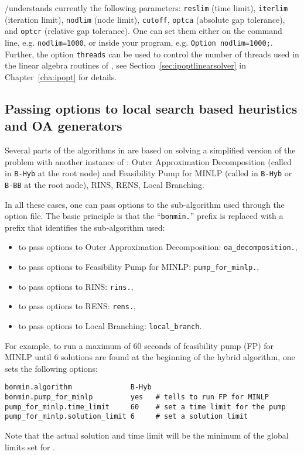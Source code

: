 \GAMS/\BONMIN understands currently the following \GAMS parameters: \texttt{reslim} (time limit), \texttt{iterlim} (iteration limit), \texttt{nodlim} (node limit), \texttt{cutoff}, \texttt{optca} (absolute gap tolerance), and \texttt{optcr} (relative gap tolerance).
One can set them either on the command line, e.g. \verb+nodlim=1000+, or inside your \GAMS program, e.g. \verb+Option nodlim=1000;+.
Further, the option \texttt{threads} can be used to control the number of threads used in the linear algebra routines of \IPOPT, see Section~\ref{sec:ipoptlinearsolver} in Chapter~\ref{cha:ipopt} for details.

\subsection{Passing options to local search based heuristics and OA generators}
Several parts of the algorithms in \BONMIN are based on solving a simplified version of the problem with another instance of \BONMIN:
Outer Approximation Decomposition (called in {\tt B-Hyb} at the root node)
and Feasibility Pump for MINLP (called in {\tt B-Hyb} or {\tt B-BB} at the root node), RINS, RENS, Local Branching.

In all these cases, one can pass options to the sub-algorithm used through the option file.
The basic principle is that the ``\texttt{bonmin.}'' prefix  is replaced with a prefix that identifies the sub-algorithm used:
\begin{itemize}
\vspace{-2ex}
\setlength{\parskip}{.2ex}
\setlength{\itemsep}{0pt}
\setlength{\partopsep}{0pt}
\item to pass options to Outer Approximation Decomposition: {\tt oa\_decomposition.},
\item to pass options to Feasibility Pump for MINLP: {\tt pump\_for\_minlp.},
\item to pass options to RINS: {\tt rins.},
\item to pass options to RENS: {\tt rens.},
\item to pass options to Local Branching: {\tt local\_branch}.
\end{itemize}

\vspace{-2ex}
For example, to run a maximum of 60 seconds of feasibility pump (FP) for MINLP until 6 solutions are found at the beginning of the hybrid algorithm, one sets the following options:
\begin{verbatim}
bonmin.algorithm              B-Hyb
bonmin.pump_for_minlp         yes   # tells to run FP for MINLP
pump_for_minlp.time_limit     60    # set a time limit for the pump
pump_for_minlp.solution_limit 6     # set a solution limit
\end{verbatim}
Note that the actual solution and time limit will be the minimum of the global limits set for \BONMIN.

